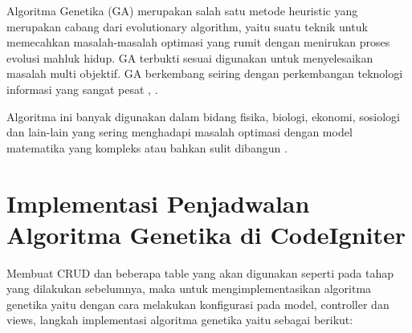 Algoritma Genetika (GA) merupakan salah satu metode heuristic yang merupakan cabang dari evolutionary algorithm, yaitu suatu teknik untuk memecahkan masalah-masalah optimasi yang rumit dengan menirukan proses evolusi mahluk hidup. GA terbukti sesuai digunakan untuk menyelesaikan masalah multi objektif. GA berkembang seiring dengan perkembangan teknologi informasi yang sangat pesat \cite{liu2016mining}, \cite{wei2015genetic}.

Algoritma ini banyak digunakan dalam bidang fisika, biologi, ekonomi, sosiologi dan lain-lain yang sering menghadapi masalah optimasi dengan model matematika yang kompleks atau bahkan sulit dibangun \cite{liu2016mining}.

\section{Implementasi Penjadwalan Algoritma Genetika di CodeIgniter}
\par Membuat CRUD dan beberapa table yang akan digunakan seperti pada tahap yang dilakukan sebelumnya, maka untuk mengimplementasikan algoritma genetika yaitu dengan cara melakukan konfigurasi pada model, controller dan views, langkah implementasi algoritma genetika yaitu sebagai berikut:
